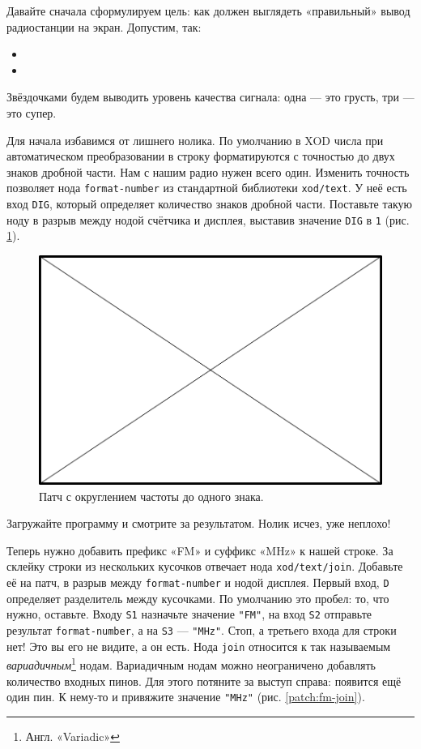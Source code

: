 Давайте сначала сформулируем цель: как должен выглядеть «правильный» вывод радиостанции на экран. Допустим, так:

\begin{itemize}
  \item {} 
  \item {} 
\end{itemize}

Звёздочками будем выводить уровень качества сигнала: одна — это грусть, три — это супер.

Для начала избавимся от лишнего нолика. По умолчанию в XOD числа при автоматическом преобразовании в строку форматируются с точностью до двух знаков дробной части. Нам с нашим радио нужен всего один. Изменить точность позволяет нода \texttt{format-number} из стандартной библиотеки \texttt{xod/text}. У неё есть вход \texttt{DIG}, который определяет количество знаков дробной части. Поставьте такую ноду в разрыв между нодой счётчика и дисплея, выставив значение \texttt{DIG} в \texttt{1} (рис. \ref{patch:fm-format-number}).

\begin{figure}
  \centering
  \includegraphics{TODO}
  \caption{Патч с округлением частоты до одного знака.}
  \label{patch:fm-format-number}
\end{figure}

Загружайте программу и смотрите за результатом. Нолик исчез, уже неплохо!

Теперь нужно добавить префикс «FM» и суффикс «MHz» к нашей строке. За склейку строки из нескольких кусочков отвечает нода \texttt{xod/text/join}. Добавьте её на патч, в разрыв между \texttt{format-number} и нодой дисплея. Первый вход, \texttt{D} определяет разделитель между кусочками. По умолчанию это пробел: то, что нужно, оставьте. Входу \texttt{S1} назначьте значение \texttt{"FM"}, на вход \texttt{S2} отправьте результат \texttt{format-number}, а на \texttt{S3} — \texttt{"MHz"}. Стоп, а третьего входа для строки нет! Это вы его не видите, а он есть. Нода \texttt{join} относится к так называемым \emph{вариадичным}\footnote{Англ. «Variadic»} нодам. Вариадичным нодам можно неограничено добавлять количество входных пинов. Для этого потяните за выступ справа: появится ещё один пин. К нему-то и привяжите значение \texttt{"MHz"} (рис. \ref{patch:fm-join}).

